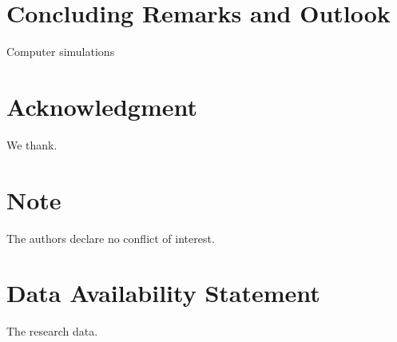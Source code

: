 \documentclass[article, a4paper, 11pt, amsmath, amssymb]{revtex4-1}
\begin{document}
\clearpage
\section{Concluding Remarks and Outlook}


\par
Computer simulations




\section*{Acknowledgment}

We thank.


\section*{Note}

The authors declare no conflict of interest.


\section*{Data Availability Statement}

The research data.




\end{document}

